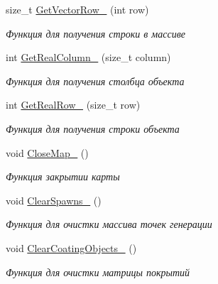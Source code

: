 \begin{DoxyCompactItemize}
size\+\_\+t \hyperlink{classrtm_1_1_world_controller_a294d87950964a203d2b7cc7fb7716168}{Get\+Vector\+Row\+\_\+} (int row)
\begin{DoxyCompactList}\small\item\em Функция для получения строки в массиве \end{DoxyCompactList}\item 
int \hyperlink{classrtm_1_1_world_controller_a73f4df1b8493c6d6d0a6b3cdb21a076c}{Get\+Real\+Column\+\_\+} (size\+\_\+t column)
\begin{DoxyCompactList}\small\item\em Функция для получения столбца объекта \end{DoxyCompactList}\item 
int \hyperlink{classrtm_1_1_world_controller_a3aad7b071f3e8a80ab159e89ec5c8035}{Get\+Real\+Row\+\_\+} (size\+\_\+t row)
\begin{DoxyCompactList}\small\item\em Функция для получения строки объекта \end{DoxyCompactList}\item 
\mbox{\label{classrtm_1_1_world_controller_a3cd1dce633aa3d4a6991ccf6c367b9a8}} 
void \hyperlink{classrtm_1_1_world_controller_a3cd1dce633aa3d4a6991ccf6c367b9a8}{Close\+Map\+\_\+} ()
\begin{DoxyCompactList}\small\item\em Функция закрытии карты \end{DoxyCompactList}\item 
\mbox{\label{classrtm_1_1_world_controller_a01b62499764622bf0e08e17456ca3550}} 
void \hyperlink{classrtm_1_1_world_controller_a01b62499764622bf0e08e17456ca3550}{Clear\+Spawns\+\_\+} ()
\begin{DoxyCompactList}\small\item\em Функция для очистки массива точек генерации \end{DoxyCompactList}\item 
\mbox{\label{classrtm_1_1_world_controller_a8dbb12f485207fe3cddbc686b0f28797}} 
void \hyperlink{classrtm_1_1_world_controller_a8dbb12f485207fe3cddbc686b0f28797}{Clear\+Coating\+Objects\+\_\+} ()
\begin{DoxyCompactList}\small\item\em Функция для очистки матрицы покрытий \end{DoxyCompactList}\item 

\end{DoxyCompactItemize}

